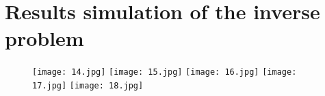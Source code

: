 \section{Results simulation of the inverse problem}




\begin{figure}[!htbp]
%
\centering
\texttt{[image: 14.jpg]}
\subcaption{}
\endminipage\hfill
{}%
\centering
\texttt{[image: 15.jpg]}
\subcaption{}
\endminipage\hfill
{}%
\centering
\texttt{[image: 16.jpg]}
\subcaption{}
\endminipage\hfill
{}%
\centering
\texttt{[image: 17.jpg]}
\subcaption{}
\endminipage\hfill
{}%
\centering
\texttt{[image: 18.jpg]}
\subcaption{}
\endminipage\hfill
\caption{}
\end{figure}






